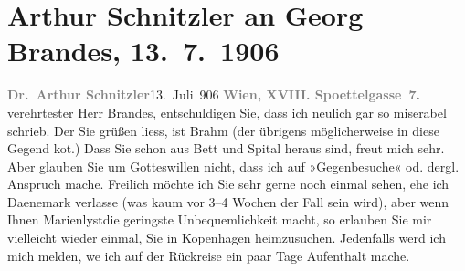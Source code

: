

         
         \renewcommand{\erwaehntePersonen}{Personen: Otto Brahm, Georg Brandes}
         \renewcommand{\erwaehnteOrte}{Orte: Dänemark, Edmund-Weiß-Gasse 7, Kopenhagen, Marienlyst, Schweden, Skodsborg}
         \renewcommand{\erwaehnteWerke}{}
               \section[Arthur Schnitzler an Georg Brandes, 13. 7. 1906]{ Arthur Schnitzler an Georg Brandes, 13. 7. 1906}\nopagebreak{}\rehead{ }\begin{ledgroupsized}[t]{13cm}\normalsize\beginnumbering \toendnotes[C]{\smallbreak\pagebreak[2]} 
\pstart
           \noindent{}{\pb}\textcolor{gray}{\textbf{Dr. Arthur Schnitzler}}\hfill 13. Juli 906\pend
           \pstart
           \textcolor{gray}{\textbf{Wien, XVIII. Spoettelgasse 7.}}\pend
           \pstart{}verehrtester Herr Brandes,\pend\pstart
           entschuldigen Sie, dass ich neulich gar so miserabel schrieb. Der Sie grüßen liess,
               ist Brahm (der übrigens möglicherweise in
               diese Gegend ko{\geminationm}t.) Dass Sie schon aus Bett und Spital
               heraus sind, freut mich sehr. Aber glauben Sie um Gotteswillen nicht, dass ich auf
               »Gegenbesuche« od. dergl. Anspruch mache. Freilich möchte ich Sie sehr gerne noch
               einmal sehen, ehe ich Daenemark verlasse (was
               kaum vor 3–4 Wochen der Fall sein wird), aber wenn Ihnen Marienlystdie geringste Unbequemlichkeit macht, so erlauben
               Sie mir vielleicht wieder einmal, Sie in Kopenhagen heimzusuchen. Jedenfalls werd ich mich melden, we{\geminationn} ich auf der Rückreise ein paar Tage Aufenthalt mache.

\end{ledgroupsized}

